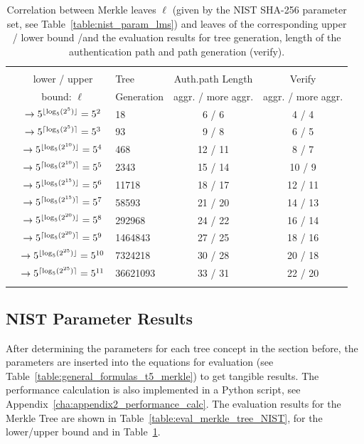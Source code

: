 \begin{table}
\centering
\begin{tabular}{r c l c c} 
 \hline\noalign{\smallskip}
 \multicolumn{5}{c}{\textbf{Evaluation Results: Lower / Upper Bound \tftree\xspace/\xspace\extree}} \\
 \noalign{\smallskip} 
 & lower / upper  & Tree & Auth.path Length & Verify \\
 \noalign{\smallskip}
 & bound: $\ell$  & Generation & aggr. / more aggr. & aggr. / more aggr.\\
 \hline\noalign{\smallskip}
 \multirow{2}{*}{$2^5$} & $\rightarrow 5^{\lfloor\log_5(2^5)\rfloor} = 5^{2} $ & 18 & 6 / 6 & 4 / 4 \\
 & $\rightarrow 5^{\lceil\log_5(2^5)\rceil} = 5^{3}$ & 93 & 9 / 8 & 6 / 5 \\
 \hline\noalign{\smallskip} 
 \multirow{2}{*}{$2^{10}$} & $\rightarrow 5^{\lfloor\log_5(2^{10})\rfloor} = 5^{4}$ & 468 & 12 / 11 & 8 / 7 \\
 & $\rightarrow 5^{\lceil\log_5(2^{10})\rceil} = 5^{5}$ & 2343 & 15 / 14 & 10 / 9 \\
 \hline\noalign{\smallskip} 
 \multirow{2}{*}{$2^{15}$}& $\rightarrow 5^{\lfloor\log_5(2^{15})\rfloor} = 5^{6}$ & 11718 & 18 / 17 & 12 / 11 \\ 
 & $\rightarrow 5^{\lceil\log_5(2^{15})\rceil} = 5^{7}$ & 58593 & 21 / 20 & 14 / 13 \\ 
 \hline\noalign{\smallskip} 
 \multirow{2}{*}{$2^{20}$} & $\rightarrow 5^{\lfloor\log_5(2^{20})\rfloor} = 5^{8}$ & 292968 & 24 / 22 & 16 / 14 \\ 
 & $\rightarrow 5^{\lceil\log_5(2^{20})\rceil} = 5^{9}$ & 1464843 & 27 / 25 & 18 / 16 \\
 \hline\noalign{\smallskip}  
  \multirow{2}{*}{$2^{25}$} & $\rightarrow 5^{\lfloor\log_5(2^{25})\rfloor} =  5^{10}$ & 7324218 & 30 / 28 & 20 / 18 \\ 
 & $\rightarrow 5^{\lceil\log_5(2^{25})\rceil} = 5^{11}$ & 36621093 & 33 / 31 & 22 / 20 \\
 \hline\noalign{\smallskip}
 \end{tabular}
\caption{Correlation between Merkle leaves $\ell$ (given by the NIST SHA-256 parameter set, see Table~\ref{table:nist_param_lms}) and leaves of the corresponding upper / lower bound \tftree\xspace/\xspace\extree and the evaluation results for tree generation, length of the authentication path and path generation (verify).}
\label{table:nist_upper_lower_bound}
\end{table}


\subsection{NIST Parameter Results}
After determining the parameters for each tree concept in the section before, the parameters are inserted into the equations for evaluation (see Table~\ref{table:general_formulas_t5_merkle}) to get tangible results. The performance calculation is also implemented in a Python script, see Appendix~\ref{cha:appendix2_performance_calc}.
The evaluation results for the Merkle Tree are shown in Table~\ref{table:eval_merkle_tree_NIST}, for the lower/upper bound \tftree and \extree in Table~\ref{table:nist_upper_lower_bound}.

